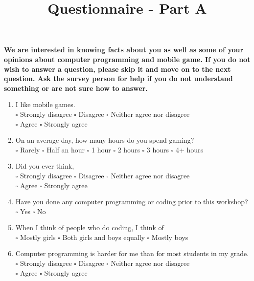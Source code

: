 \documentclass[12pt]{article}\pagestyle{myheadings}
\title{Questionnaire - Part A}
\theoremstyle{plain}
\begin{document}
\begin{mdframed}

\textbf{We are interested in knowing facts about you as well as some of your opinions about
computer programming and mobile game. If you do not wish to answer a question, please skip it and move on to the next question. Ask the survey person for help if you do not understand something or are not sure how
to answer.}

\end{mdframed}
\begin{mdframed}
\begin{enumerate}

\item I like mobile games. \\
$\square$ Strongly disagree $\square$ Disagree $\square$ Neither agree nor disagree \\$\square$ Agree $\square$ Strongly agree

\item On an average day, how many hours do you spend gaming? \\
$\square$ Rarely $\square$ Half an hour	$\square$ 1 hour $\square$ 2 hours $\square$ 3 hours $\square$	4+ hours

\item Did you ever think,  \\
$\square$ Strongly disagree $\square$ Disagree $\square$ Neither agree nor disagree\\ $\square$ Agree $\square$ Strongly agree

\item Have you done any computer programming or coding prior to this workshop? \\
$\square$ Yes $\square$ No








\item When I think of people who do coding, I think of \\
$\square$ Mostly girls $\square$ Both girls and boys equally $\square$ Mostly boys

\item Computer programming is harder for me than for most students in my grade.\\
$\square$ Strongly disagree $\square$ Disagree $\square$ Neither agree nor disagree \\$\square$ Agree $\square$ Strongly agree



\end{enumerate}
\end{mdframed}
\end{document}
